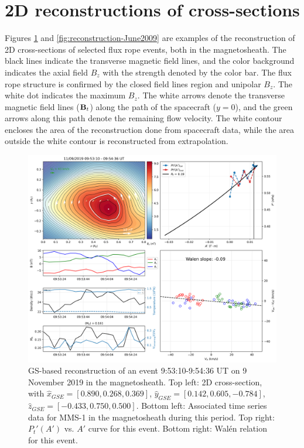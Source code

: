 \section{2D reconstructions of cross-sections}
Figures \ref{fig:reconstruction-Nov2019} and \ref{fig:reconstruction-June2009} are examples of the reconstruction of 2D cross-sections of selected flux rope events, both in the magnetosheath. The black lines indicate the transverse magnetic field lines, and the color background indicates the axial field $B_z$ with the strength denoted by the color bar. The flux rope structure is confirmed by the closed field lines region and unipolar $B_z$. The white dot indicates the maximum $B_z$. The white arrows denote the transverse magnetic field lines ($\mathbf{B}_t$) along the path of the spacecraft ($y=0$), and the green arrows along this path denote the remaining flow velocity. The white contour encloses the area of the reconstruction done from spacecraft data, while the area outside the white contour is reconstructed from extrapolation.

\begin{figure}[ht!]
    \centering
    \includegraphics[width=\textwidth]{Figures/Reconstructions/timeseries_walenTest_20191109_20191110.png}
    \caption[GS-based event reconstruction for 9 November 2019]{GS-based reconstruction of an event 9:53:10-9:54:36 UT on 9 November 2019 in the magnetosheath. Top left: 2D cross-section, with $\hat{x}_{GSE}=[0.890, 0.268, 0.369]$, $\hat{y}_{GSE}=[0.142, 0.605, -0.784]$, $\hat{z}_{GSE}=[-0.433, 0.750, 0.500]$. Bottom left: Associated time series data for MMS-1 in the magnetosheath during this period. Top right: $P_t'(A')$ vs. $A'$ curve for this event. Bottom right: Wal\'en relation for this event.}
    \label{fig:reconstruction-Nov2019}
\end{figure}

